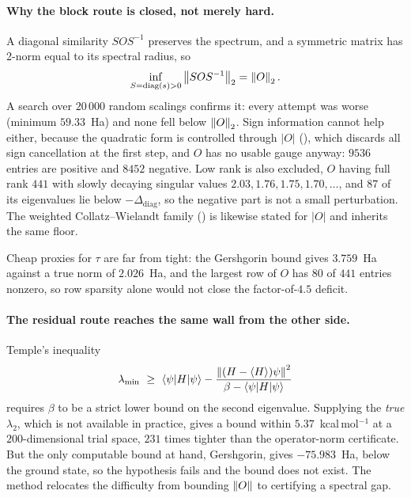 \paragraph{Why the block route is closed, not merely hard.}
A diagonal similarity $SOS^{-1}$ preserves the spectrum, and a symmetric matrix has
2-norm equal to its spectral radius, so
\[
  \inf_{S=\operatorname{diag}(s)>0}\left\lVert SOS^{-1}\right\rVert_2 = \left\lVert O\right\rVert_2 .
  \label{eq:similarity-floor}
\]
A search over $20\,000$ random scalings confirms it: every attempt was worse
(minimum $59.33$~Ha) and none fell below $\left\lVert O\right\rVert_2$. Sign information cannot help
either, because the quadratic form is controlled through $|O|$
(), which discards all sign cancellation at the first
step, and $O$ has no usable gauge anyway: $9536$ entries are positive and $8452$
negative. Low rank is also excluded, $O$ having full rank $441$ with slowly decaying
singular values $2.03,1.76,1.75,1.70,\dots$, and $87$ of its eigenvalues lie below
$-\Delta_{\mathrm{diag}}$, so the negative part is not a small perturbation. The
weighted Collatz--Wielandt family () is likewise
stated for $|O|$ and inherits the same floor.

Cheap proxies for $\tau$ are far from tight: the Gershgorin bound gives
$3.759$~Ha against a true norm of $2.026$~Ha, and the largest row of $O$ has $80$ of
$441$ entries nonzero, so row sparsity alone would not close the factor-of-$4.5$
deficit.

\paragraph{The residual route reaches the same wall from the other side.}
Temple's inequality
\[
  \lambda_{\min}\ \ge\ \langle\psi|H|\psi\rangle
   - \frac{\norm{(H-\langle H\rangle)\psi}^{2}}{\beta-\langle\psi|H|\psi\rangle}
\]
requires $\beta$ to be a strict lower bound on the second eigenvalue. Supplying the
\emph{true} $\lambda_2$, which is not available in practice, gives a bound within
$5.37$~kcal\,mol$^{-1}$ at a $200$-dimensional trial space, $231$ times tighter than
the operator-norm certificate. But the only computable bound at hand, Gershgorin,
gives $-75.983$~Ha, below the ground state, so the hypothesis fails and the bound
does not exist. The method relocates the difficulty from bounding $\left\lVert O\right\rVert$ to
certifying a spectral gap.

